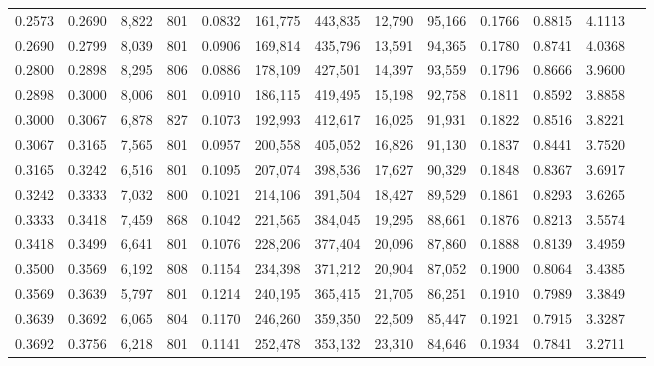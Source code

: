 \begin{tabular}{rrrrrrrrrrrrr}
0.2573 & 0.2690 &  8,822 &   801 &                                     0.0832 & 161,775 & 443,835 &  12,790 &  95,166 & 0.1766 & 0.8815 & 4.1113 \\
0.2690 & 0.2799 &  8,039 &   801 &                                     0.0906 & 169,814 & 435,796 &  13,591 &  94,365 & 0.1780 & 0.8741 & 4.0368 \\
0.2800 & 0.2898 &  8,295 &   806 &                                     0.0886 & 178,109 & 427,501 &  14,397 &  93,559 & 0.1796 & 0.8666 & 3.9600 \\
0.2898 & 0.3000 &  8,006 &   801 &                                     0.0910 & 186,115 & 419,495 &  15,198 &  92,758 & 0.1811 & 0.8592 & 3.8858 \\
0.3000 & 0.3067 &  6,878 &   827 &                                     0.1073 & 192,993 & 412,617 &  16,025 &  91,931 & 0.1822 & 0.8516 & 3.8221 \\
0.3067 & 0.3165 &  7,565 &   801 &                                     0.0957 & 200,558 & 405,052 &  16,826 &  91,130 & 0.1837 & 0.8441 & 3.7520 \\
0.3165 & 0.3242 &  6,516 &   801 &                                     0.1095 & 207,074 & 398,536 &  17,627 &  90,329 & 0.1848 & 0.8367 & 3.6917 \\
0.3242 & 0.3333 &  7,032 &   800 &                                     0.1021 & 214,106 & 391,504 &  18,427 &  89,529 & 0.1861 & 0.8293 & 3.6265 \\
0.3333 & 0.3418 &  7,459 &   868 &                                     0.1042 & 221,565 & 384,045 &  19,295 &  88,661 & 0.1876 & 0.8213 & 3.5574 \\
0.3418 & 0.3499 &  6,641 &   801 &                                     0.1076 & 228,206 & 377,404 &  20,096 &  87,860 & 0.1888 & 0.8139 & 3.4959 \\
0.3500 & 0.3569 &  6,192 &   808 &                                     0.1154 & 234,398 & 371,212 &  20,904 &  87,052 & 0.1900 & 0.8064 & 3.4385 \\
0.3569 & 0.3639 &  5,797 &   801 &                                     0.1214 & 240,195 & 365,415 &  21,705 &  86,251 & 0.1910 & 0.7989 & 3.3849 \\
0.3639 & 0.3692 &  6,065 &   804 &                                     0.1170 & 246,260 & 359,350 &  22,509 &  85,447 & 0.1921 & 0.7915 & 3.3287 \\
0.3692 & 0.3756 &  6,218 &   801 &                                     0.1141 & 252,478 & 353,132 &  23,310 &  84,646 & 0.1934 & 0.7841 & 3.2711 \\

\end{tabular}
